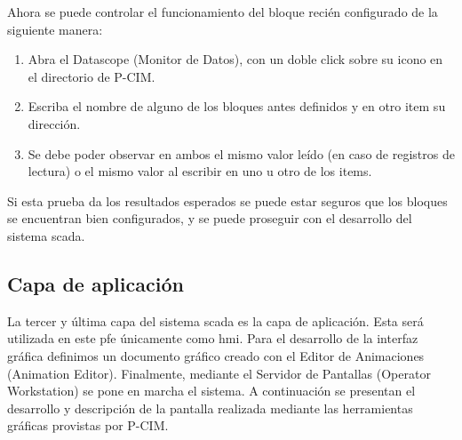 Ahora se puede controlar el funcionamiento del bloque recién configurado de la 
siguiente manera:
\begin{enumerate}
  \item Abra el Datascope (Monitor de Datos), con un doble click sobre su icono 
  en el directorio de P-CIM.
  \item Escriba el nombre de alguno de los bloques antes definidos  y en otro 
  item su dirección.
  \item Se debe poder observar en ambos el mismo valor leído (en caso de
  registros de lectura) o el mismo valor al escribir en uno u otro de los items.
\end{enumerate}
Si esta prueba da los resultados esperados se puede estar seguros que
los bloques se encuentran bien configurados, y se puede proseguir con el
desarrollo del sistema \gls{scada}.

\subsection{Capa de aplicación}
\label{subsec:CapaAplicacion}

La tercer y última capa del sistema \gls{scada} es la capa de aplicación. Esta 
será utilizada en este \gls{pfe} únicamente como \gls{hmi}. Para el
desarrollo de la interfaz gráfica definimos un documento gráfico creado con el 
Editor de Animaciones (Animation Editor). Finalmente, mediante el Servidor de 
Pantallas (Operator Workstation) se pone en marcha el sistema. A continuación se 
presentan el desarrollo y descripción de la pantalla realizada mediante las 
herramientas gráficas provistas por P-CIM.



